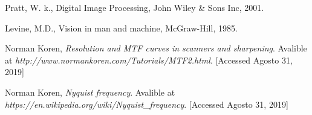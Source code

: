 \documentclass[conference]{IEEEtran}
\begin{document}
\begin{thebibliography}{00}
 Pratt, W. k., Digital Image Processing, John Wiley \& Sons Inc, 2001.

 Levine, M.D., Vision in man and machine, McGraw-Hill, 1985.

 Norman Koren, \textit{Resolution and MTF curves in scanners and sharpening}. Avalible at \textit{http://www.normankoren.com/Tutorials/MTF2.html}. [Accessed Agosto 31, 2019]

 Norman Koren, \textit{Nyquist frequency}. Avalible at \textit{https://en.wikipedia.org/wiki/Nyquist\_frequency}. [Accessed Agosto 31, 2019]
\end{thebibliography}







\end{document}
